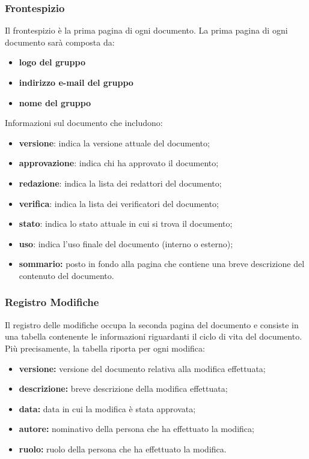 \subsubsection{Frontespizio}
Il frontespizio è la prima pagina di ogni documento. 
La prima pagina di ogni documento sarà composta da:
\begin{itemize}
	\item \textbf{logo del gruppo}
		\item \textbf{indirizzo e-mail del gruppo}
			\item \textbf{nome del gruppo}
\end{itemize}
Informazioni sul documento che includono:
\begin{itemize}
	\item \textbf{versione}: indica la versione attuale del documento;
		\item \textbf{approvazione}: indica chi ha approvato il documento;
			\item \textbf{redazione}: indica la lista dei redattori del documento;
				\item \textbf{verifica}: indica la lista dei verificatori del documento; 
					\item \textbf{stato}: indica lo stato attuale in cui si trova il documento;
						\item \textbf{uso}: indica l’uso finale del documento (interno o esterno); 
							\item \textbf{sommario:} posto in fondo alla pagina che contiene una breve descrizione del contenuto del documento.
\end{itemize}
\subsubsection{Registro Modifiche}
Il registro delle modifiche occupa la seconda pagina del documento e consiste in una tabella contenente le informazioni riguardanti il ciclo di vita del documento.
\\Più precisamente, la tabella riporta per ogni modifica: 
\begin{itemize}
\item \textbf{versione:} versione del documento relativa alla modifica effettuata;
	\item \textbf{descrizione:} breve descrizione della modifica effettuata;
		\item \textbf{data:} data in cui la modifica è stata approvata;
			\item \textbf{autore:} nominativo della persona che ha effettuato la modifica; 
				\item \textbf{ruolo:} ruolo della persona che ha effettuato la modifica. 
\end{itemize}
